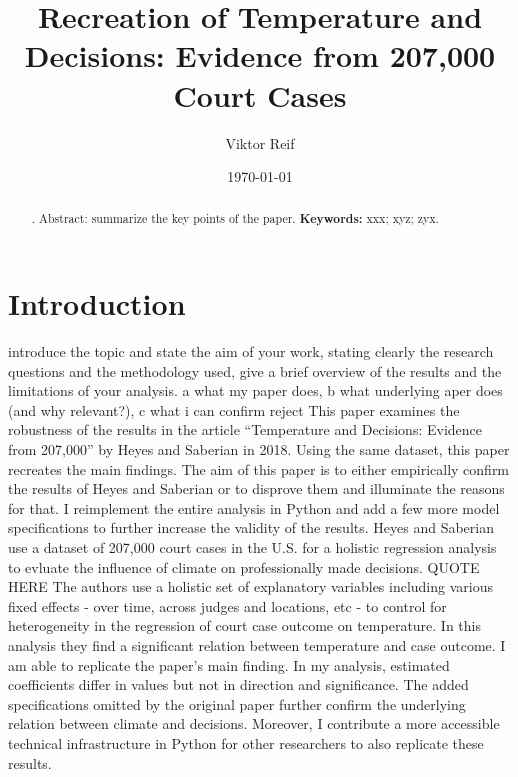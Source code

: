 \documentclass[11pt]{article}
\title{Recreation of Temperature and Decisions: Evidence from 207,000
	Court Cases}
\author{Viktor Reif}
\date{\today}
\begin{document}
\maketitle


\begin{abstract}
	\singlespacing
	. Abstract: summarize the key points of the paper.
	\newline \noindent \textbf{Keywords:} xxx; xyz; zyx. 
\end{abstract}


\section{Introduction}
introduce the topic and state the aim of your work, stating clearly the
research questions and the methodology used, give a brief overview of the results and the
limitations of your analysis.
a what my paper does, b what underlying aper does (and why relevant?), c what i can confirm reject
\newline This paper examines the robustness of the results in the article “Temperature and Decisions: Evidence from 207,000” by Heyes and Saberian in 2018. Using the same dataset, this paper recreates the main findings. The aim of this paper is to either empirically confirm the results of Heyes and Saberian or to disprove them and illuminate the reasons for that. I reimplement the entire analysis in Python and add a few more model specifications to further increase the validity of the results.
\newline Heyes and Saberian use a dataset of 207,000 court cases in the U.S. for a holistic regression analysis to evluate the influence of climate on professionally made decisions. QUOTE HERE The authors use a holistic set of explanatory variables including various fixed effects - over time, across judges and locations, etc - to control for heterogeneity in the regression of court case outcome on temperature. In this analysis they find a significant relation between temperature and case outcome.
\newline I am able to replicate the paper’s main finding. In my analysis, estimated coefficients differ in values but not in direction and significance. The added specifications omitted by the original paper further confirm the underlying relation between climate and decisions. Moreover, I contribute a more accessible technical infrastructure in Python for other researchers to also replicate these results.  
\end{document}
